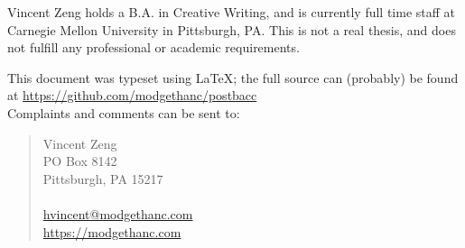 Vincent Zeng holds a B.A. in Creative Writing, and is currently full time staff
at Carnegie Mellon University in Pittsburgh, PA. This is not a real thesis, and
does not fulfill any professional or academic requirements.

This document was typeset using \LaTeX; the full source can (probably) be found
at \url{https://github.com/modgethanc/postbacc}\\

Complaints and comments can be sent to:

\begin{quote}
Vincent Zeng\\
PO Box 8142\\
Pittsburgh, PA 15217\\
\\
\url{hvincent@modgethanc.com}\\
\url{https://modgethanc.com}
\end{quote}
